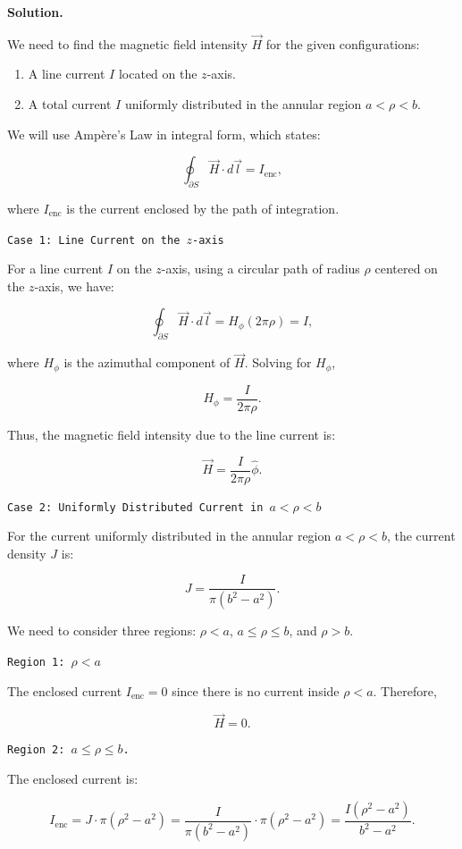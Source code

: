 \documentclass[12pt, a4paper, oneside]{report}
\newenvironment{solution}{
  \par\medskip\noindent
  \textbf{Solution.}\quad\itshape
  \par\noindent\makebox[\linewidth]{\rule{\textwidth}{0.4pt}}
}{
  \par\noindent\makebox[\linewidth]{\rule{\textwidth}{0.4pt}}
  \par\medskip
}
\begin{document}
\begin{solution}

We need to find the magnetic field intensity \(\vec{H}\) for the given configurations:

\begin{enumerate}
\item  A line current \(I\) located on the \(z\)-axis.
\item  A total current \(I\) uniformly distributed in the annular region \(a < \rho < b\).
\end{enumerate}


We will use Ampère's Law in integral form, which states:

\[
\oint_{\partial S} \vec{H} \cdot d\vec{l} = I_{\text{enc}},
\]

where \(I_{\text{enc}}\) is the current enclosed by the path of integration.

\texttt{Case 1: Line Current on the \(z\)-axis}

For a line current \(I\) on the \(z\)-axis, using a circular path of radius \(\rho\) centered on the \(z\)-axis, we have:

\[
\oint_{\partial S} \vec{H} \cdot d\vec{l} = H_\phi (2\pi\rho) = I,
\]

where \(H_\phi\) is the azimuthal component of \(\vec{H}\). Solving for \(H_\phi\),

\[
H_\phi = \frac{I}{2\pi\rho}.
\]

Thus, the magnetic field intensity due to the line current is:

\[
\vec{H} = \frac{I}{2\pi\rho} \hat{\phi}.
\]

\texttt{Case 2: Uniformly Distributed Current in \(a < \rho < b\)}

For the current uniformly distributed in the annular region \(a < \rho < b\), the current density \(J\) is:

\[
J = \frac{I}{\pi(b^2 - a^2)}.
\]

We need to consider three regions: \(\rho < a\), \(a \leq \rho \leq b\), and \(\rho > b\).

\texttt{Region 1: \(\rho < a\)}

The enclosed current \(I_{\text{enc}} = 0\) since there is no current inside \(\rho < a\). Therefore,

\[
\vec{H} = 0.
\]

\texttt{Region 2: \(a \leq \rho \leq b\).}

The enclosed current is:

\[
I_{\text{enc}} = J \cdot \pi(\rho^2 - a^2) = \frac{I}{\pi(b^2 - a^2)} \cdot \pi(\rho^2 - a^2) = \frac{I(\rho^2 - a^2)}{b^2 - a^2}.
\]


\end{solution}
\end{document}
